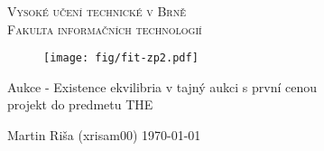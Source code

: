 
\begin{titlepage}
\begin{center}
\textsc{\Huge Vysoké učení technické v Brně \\
\medskip
\huge Fakulta informačních technologií} \\


\begin{figure}[h]
\centering
\texttt{[image: fig/fit-zp2.pdf]}
\end{figure}


\LARGE Aukce - Existence ekvilibria v tajný aukci s první cenou  \\
projekt do predmetu THE


\end{center}
{\Large Martin Riša (xrisam00) \hfill \today}
\end{titlepage}
